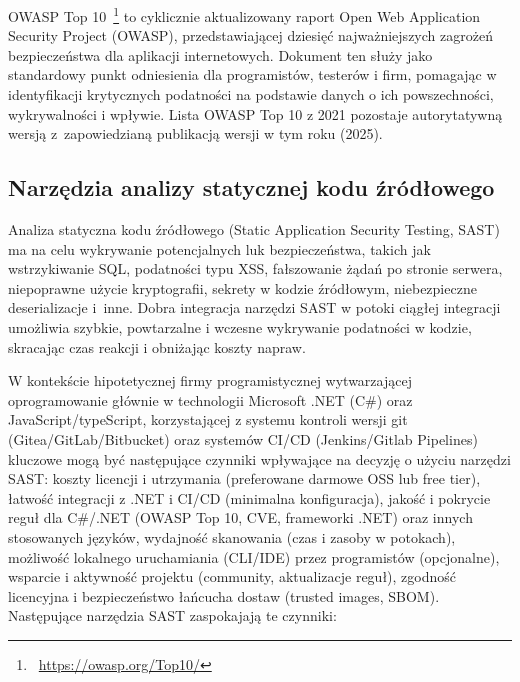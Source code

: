 OWASP Top 10~\footnote{~\url{https://owasp.org/Top10/}} to cyklicznie aktualizowany raport Open Web Application Security Project (OWASP), przedstawiającej dziesięć najważniejszych zagrożeń bezpieczeństwa dla aplikacji internetowych. Dokument ten służy jako standardowy punkt odniesienia dla programistów, testerów i firm, pomagając w identyfikacji krytycznych podatności na podstawie danych o ich powszechności, wykrywalności i wpływie. Lista OWASP Top 10 z 2021 pozostaje autorytatywną wersją z~zapowiedzianą publikacją wersji w tym roku (2025).

\subsection{Narzędzia analizy statycznej kodu źródłowego}

Analiza statyczna kodu źródłowego (Static Application Security Testing, SAST) ma na celu wykrywanie potencjalnych luk bezpieczeństwa, takich jak wstrzykiwanie SQL, podatności typu XSS, fałszowanie żądań po stronie serwera, niepoprawne użycie kryptografii, sekrety w kodzie źródłowym, niebezpieczne deserializacje i~inne. Dobra integracja narzędzi SAST w potoki ciągłej integracji umożliwia szybkie, powtarzalne i wczesne wykrywanie podatności w kodzie, skracając czas reakcji i obniżając koszty napraw.

W kontekście hipotetycznej firmy programistycznej wytwarzającej oprogramowanie głównie w technologii Microsoft .NET (C\#) oraz JavaScript/typeScript, korzystającej z systemu kontroli wersji git (Gitea/GitLab/Bitbucket) oraz systemów CI/CD (Jenkins/Gitlab Pipelines) kluczowe mogą być następujące czynniki wpływające na decyzję o użyciu narzędzi SAST: koszty licencji i utrzymania (preferowane darmowe OSS lub free tier), łatwość integracji z .NET i CI/CD (minimalna konfiguracja), jakość i pokrycie reguł dla C\#/.NET (OWASP Top 10, CVE, frameworki .NET) oraz innych stosowanych języków, wydajność skanowania (czas i zasoby w potokach), możliwość lokalnego uruchamiania (CLI/IDE) przez programistów (opcjonalne), wsparcie i aktywność projektu (community, aktualizacje reguł), zgodność licencyjna i bezpieczeństwo łańcucha dostaw (trusted images, SBOM). Następujące narzędzia SAST zaspokajają te czynniki:

